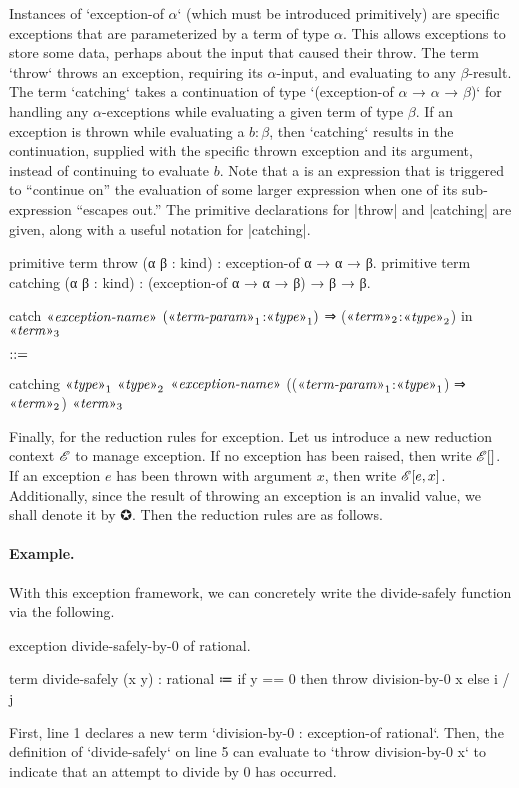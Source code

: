 Instances of \code`exception-of $α$` (which must be introduced primitively) are specific exceptions that are parameterized by a term of type $α$. This allows exceptions to store some data, perhaps about the input that caused their throw.
The term \code`throw` throws an exception, requiring its $α$-input, and evaluating to any $β$-result.
The term \code`catching` takes a continuation of type \code`(exception-of $α$ → $α$ → $β$)` for handling any $α$-exceptions while evaluating a given term of type $β$.
If an exception is thrown while evaluating a $b:β$, then \code`catching` results in the continuation, supplied with the specific thrown exception and its argument, instead of continuing to evaluate $b$.
Note that a  is an expression that is triggered to ``continue on'' the evaluation of some larger expression when one of its sub-expression ``escapes out.''
The primitive declarations for \code|throw| and \code|catching| are given, along with a useful notation for \code|catching|.
%
\begin{program}[caption={Definitions for exception}]
primitive term throw    (α β : kind) : exception-of α → α → β.
primitive term catching (α β : kind) : (exception-of α → α → β) → β → β.
\end{program}
%
\begin{notational}[caption={Notation for exception}]
catch { $\mvar{exception-name}$ $(\mvar{term-param}_1$:$\mvar{type}_1)$ ⇒ ($\mvar{term}_2$:$\mvar{type}_2$) }
  in $\mvar{term}_3$

$\syneq$

catching $\mvar{type}_1$ $\mvar{type}_2$
  $\mvar{exception-name}$
  (($\mvar{term-param}_1$:$\mvar{type}_1$) ⇒ $\mvar{term}_2$)
  $\mvar{term}_3$
\end{notational}

Finally, for the reduction rules for exception.
Let us introduce a new reduction context $\exctx$ to manage exception.
If no exception has been raised, then write $\noexception$.
If an exception $e$ has been thrown with argument $x$, then write $\exception{e, x}$.
Additionally, since the result of throwing an exception is an invalid value, we shall denote it by ✪.
Then the reduction rules are as follows.
%

%
\paragraph{Example.}
With this exception framework, we can concretely write the divide-safely function via the following.
\begin{snippet}[numbers=left]
exception divide-safely-by-0 of rational.

term divide-safely (x y) : rational
  ≔ if y == 0
      then throw division-by-0 x
      else i / j
\end{snippet}
First, line 1 declares a new term \code`division-by-0 : exception-of rational`.
Then, the definition of \code`divide-safely` on line 5 can evaluate to \code`throw division-by-0 x` to indicate that an attempt to divide by $0$ has occurred.


